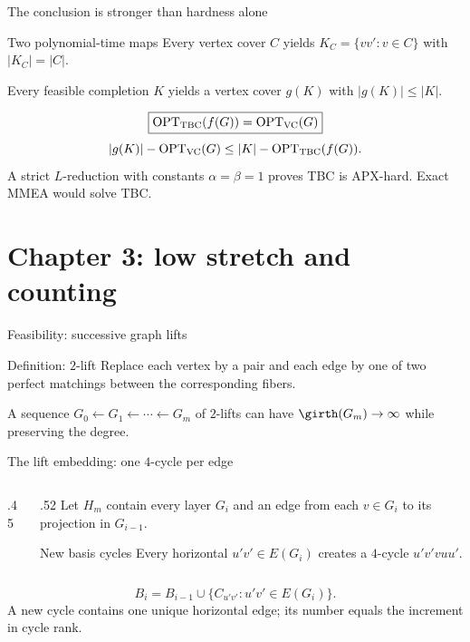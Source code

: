 \begin{frame}{The conclusion is stronger than hardness alone}
 \begin{block}{Two polynomial-time maps}
 Every vertex cover $C$ yields $K_C=\{vv':v\in C\}$ with $|K_C|=|C|$.

 Every feasible completion $K$ yields a vertex cover $g(K)$ with $|g(K)|\le|K|$.
 \end{block}
 \[\boxed{\operatorname{OPT}_{\rm TBC}(f(G))=\operatorname{OPT}_{\rm VC}(G)}\]
 \[ |g(K)|-\operatorname{OPT}_{\rm VC}(G)
 \le |K|-\operatorname{OPT}_{\rm TBC}(f(G)). \]
 \vspace{.14cm}
  A strict $L$-reduction with constants $\alpha=\beta=1$ proves TBC is APX-hard. Exact MMEA would solve TBC.
\end{frame}


\section{Chapter 3: low stretch and counting}


\begin{frame}{Feasibility: successive graph lifts}
 \begin{block}{Definition: \(2\)-lift}
 Replace each vertex by a pair and each edge by one of two perfect matchings between the corresponding fibers.
 \end{block}
 \begin{center}\resizebox{.62\textwidth}{!}{\LiftLayersFig}\end{center}
  A sequence \(G_0\leftarrow G_1\leftarrow\cdots\leftarrow G_m\) of \(2\)-lifts can have \(\girth(G_m)\to\infty\) while preserving the degree.
\end{frame}


\begin{frame}{The lift embedding: one \(4\)-cycle per edge}
 \begin{columns}[c,onlytextwidth]
  \begin{column}{.45\textwidth}
   \begin{center}\resizebox{.69\linewidth}{!}{\LiftSquareFig}\end{center}
  \end{column}
  \begin{column}{.52\textwidth}
   Let \(H_m\) contain every layer \(G_i\) and an edge from each \(v\in G_i\) to its projection in \(G_{i-1}\).
   \begin{block}{New basis cycles}
   Every horizontal \(u'v'\in E(G_i)\) creates a \(4\)-cycle \(u'v'vuu'\).
   \end{block}
  \end{column}
 \end{columns}
 \[B_i=B_{i-1}\cup\{C_{u'v'}:u'v'\in E(G_i)\}.\]
 \small A new cycle contains one unique horizontal edge; its number equals the increment in cycle rank.
\end{frame}



